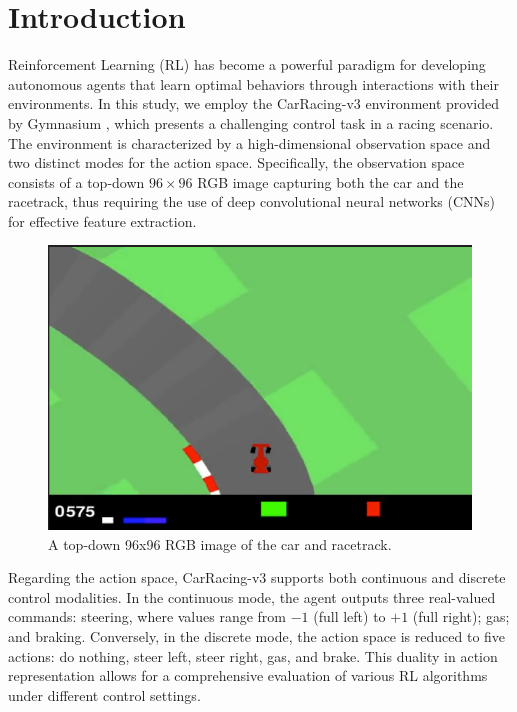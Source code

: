 \documentclass[../CSC_52081_EP.tex]{subfiles}
\begin{document}
    \section{Introduction}
    \label{sec:intro}

Reinforcement Learning (RL) has become a powerful paradigm for developing autonomous agents that learn optimal behaviors through interactions with their environments. In this study, we employ the CarRacing-v3 environment provided by Gymnasium \cite{gymnasium}, which presents a challenging control task in a racing scenario. The environment is characterized by a high-dimensional observation space and two distinct modes for the action space. Specifically, the observation space consists of a top-down \(96\times96\) RGB image capturing both the car and the racetrack, thus requiring the use of deep convolutional neural networks (CNNs) for effective feature extraction.

\begin{figure}[H]
    \centering
    \includegraphics[scale = 0.3]{figures/car_racing_v3.png}
    \caption{A top-down 96x96 RGB image of the car and racetrack.}
    \label{fig:car_racing_v3}
\end{figure}

Regarding the action space, CarRacing-v3 supports both continuous and discrete control modalities. In the continuous mode, the agent outputs three real-valued commands: steering, where values range from \(-1\) (full left) to \(+1\) (full right); gas; and braking. Conversely, in the discrete mode, the action space is reduced to five actions: do nothing, steer left, steer right, gas, and brake. This duality in action representation allows for a comprehensive evaluation of various RL algorithms under different control settings.
\end{document}
